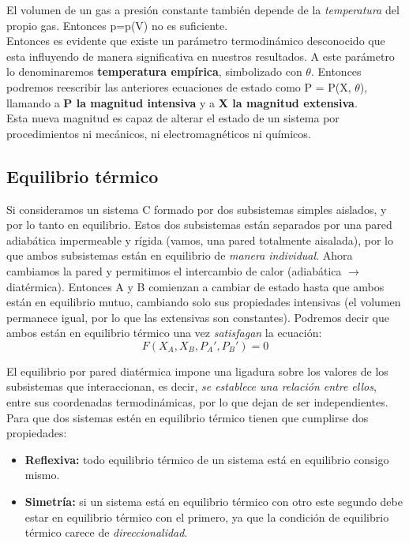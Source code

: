 \documentclass[12pt,a4paper]{article}
\begin{document}
El volumen de un gas a presión constante también depende de la \textit{temperatura} del propio gas. Entonces p=p(V) no es suficiente. \\

Entonces es evidente que existe un parámetro termodinámico desconocido que esta influyendo de manera significativa en nuestros resultados. A este parámetro lo denominaremos \textbf{temperatura empírica}, simbolizado con $ \theta $. Entonces podremos reescribir las anteriores ecuaciones de estado como P = P(X, $\theta$), llamando a \textbf{P la magnitud intensiva} y a \textbf{X la magnitud extensiva}. \\

Esta nueva magnitud es capaz de alterar el estado de un sistema por procedimientos ni mecánicos, ni electromagnéticos ni químicos. 

\subsection{Equilibrio térmico}

Si consideramos un sistema C formado por dos subsistemas simples aislados, y por lo tanto en equilibrio. Estos dos subsistemas están separados por una pared adiabática impermeable y rígida (vamos, una pared totalmente aisalada), por lo que ambos subsistemas están en equilibrio de \textit{manera individual}. Ahora cambiamos la pared y permitimos el intercambio de calor (adiabática $\longrightarrow$ diatérmica). Entonces A y B comienzan a cambiar de estado hasta que ambos están en equilibrio mutuo, cambiando solo sus propiedades intensivas (el volumen permanece igual, por lo que las extensivas son constantes). Podremos decir que ambos están en equilibrio térmico una vez \textit{satisfagan} la ecuación: $$ F(X_A, X_B, P_A', P_B')=0 $$

El equilibrio por pared diatérmica impone una ligadura sobre los valores de los subsistemas que interaccionan, es decir, \textit{se establece una relación entre ellos}, entre sus coordenadas termodinámicas, por lo que dejan de ser independientes. Para que dos sistemas estén en equilibrio térmico tienen que cumplirse dos propiedades: \begin{itemize}

\item \textbf{Reflexiva:} todo equilibrio térmico de un sistema está en equilibrio consigo mismo.

\item \textbf{Simetría:} si un sistema está en equilibrio térmico con otro este segundo debe estar en equilibrio térmico con el primero, ya que la condición de equilibrio térmico carece de \textit{direccionalidad}.

\end{itemize}
\end{document}

